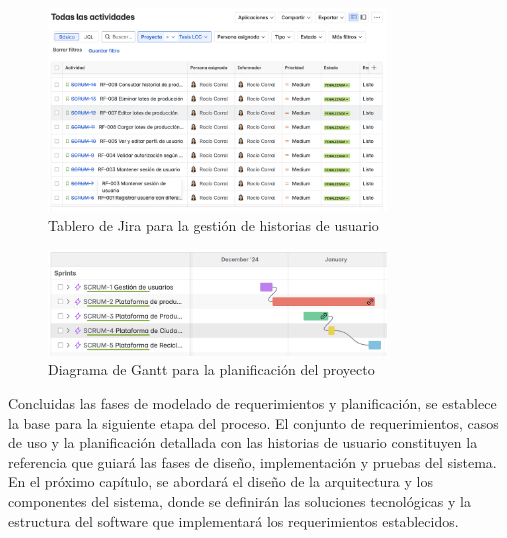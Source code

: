 \begin{figure}[!htpb]
  \centering
  \includegraphics[width=0.8\textwidth]{Figures/jira-board.png}
  \caption{Tablero de Jira para la gestión de historias de usuario}
  \label{fig:jira-board}
\end{figure}


\begin{figure}[!htpb]
  \centering
  \includegraphics[width=0.8\textwidth]{Figures/gantt-chart.png}
  \caption{Diagrama de Gantt para la planificación del proyecto}
  \label{fig:gantt-chart}
\end{figure}

Concluidas las fases de modelado de requerimientos y planificación, se establece la base para la siguiente etapa del proceso. El conjunto de requerimientos, casos de uso y la planificación detallada con las historias de usuario constituyen la referencia que guiará las fases de diseño, implementación y pruebas del sistema. En el próximo capítulo, se abordará el diseño de la arquitectura y los componentes del sistema, donde se definirán las soluciones tecnológicas y la estructura del software que implementará los requerimientos establecidos.
